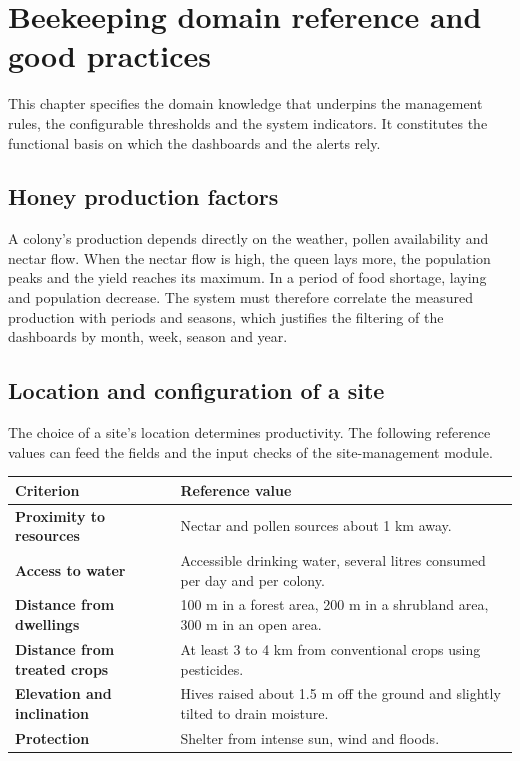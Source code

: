 \chapter{Beekeeping domain reference and good practices}
This chapter specifies the domain knowledge that underpins the management rules,
the configurable thresholds and the system indicators. It constitutes the
functional basis on which the dashboards and the alerts rely.

\section{Honey production factors}
A colony's production depends directly on the weather, pollen availability and
nectar flow. When the nectar flow is high, the queen lays more, the population
peaks and the yield reaches its maximum. In a period of food shortage, laying
and population decrease. The system must therefore correlate the measured
production with periods and seasons, which justifies the filtering of the
dashboards by month, week, season and year.

\section{Location and configuration of a site}
The choice of a site's location determines productivity. The following reference
values can feed the fields and the input checks of the site-management module.
\begin{xltabular}{\textwidth}{>{\bfseries}p{5.5cm} X}
\toprule
\textbf{Criterion} & \textbf{Reference value} \\
\midrule
\endhead
Proximity to resources & Nectar and pollen sources about 1 km away. \\
Access to water & Accessible drinking water, several litres consumed per day and per colony. \\
Distance from dwellings & 100 m in a forest area, 200 m in a shrubland area, 300 m in an open area. \\
Distance from treated crops & At least 3 to 4 km from conventional crops using pesticides. \\
Elevation and inclination & Hives raised about 1.5 m off the ground and slightly tilted to drain moisture. \\
Protection & Shelter from intense sun, wind and floods. \\
\bottomrule
\end{xltabular}

